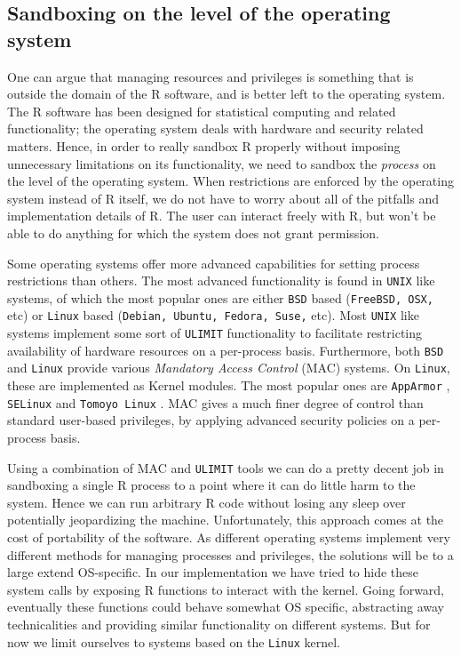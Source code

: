 \documentclass{jss}
\newcommand{\R}{\textsf{R}\xspace}
\newcommand{\AppArmor}{\texttt{AppArmor}\xspace}
\newcommand{\Linux}{\texttt{Linux}\xspace}
\newcommand{\ULIMIT}{\texttt{ULIMIT}\xspace}
\begin{document}
\subsection{Sandboxing on the level of the operating system}

One can argue that managing resources and privileges is something that
is outside the domain of the \R software, and is better left to the
operating system. The \R software has been designed for statistical
computing and related functionality; the operating system deals with hardware
and security related matters. Hence, in order to really sandbox \R
properly without imposing unnecessary limitations on its functionality, we need
to sandbox the \emph{process} on the level of the operating system. When
restrictions are enforced by the operating system instead of \R
itself, we do not have to worry about all of the pitfalls and implementation
details of \R. The user can interact freely with \R, but
won't be able to do anything for which the system does not grant permission. 

Some operating systems offer more advanced capabilities for setting process
restrictions than others. The most advanced functionality is found in
\texttt{UNIX} like systems, of which the most popular ones are either
\texttt{BSD} based (\texttt{FreeBSD, OSX,} etc) or \Linux based
(\texttt{Debian, Ubuntu, Fedora, Suse,} etc). Most \texttt{UNIX} like
systems implement some sort of \ULIMIT functionality to facilitate
restricting availability of hardware resources on a per-process basis.
Furthermore, both \texttt{BSD} and \Linux provide various
\emph{Mandatory Access Control} (MAC) systems. On \Linux,
these are implemented as Kernel modules. The most popular ones are \AppArmor
\citep{apparmor}, \texttt{SELinux} \citep{selinux} and \texttt{Tomoyo Linux}
\citep{tomoyo}. MAC gives a much finer degree of control than standard
user-based privileges, by applying advanced security policies on a per-process
basis.

Using a combination of MAC and \ULIMIT tools we can do a pretty
decent job in sandboxing a single \R process to a point where it can do little
harm to the system. Hence we can run arbitrary \R code without losing
any sleep over potentially jeopardizing the machine. Unfortunately, this
approach comes at the cost of portability of the software. As different
operating systems implement very different methods for managing processes and
privileges, the solutions will be to a large extend OS-specific. In our
implementation we have tried to hide these system calls by exposing \R functions
to interact with the kernel. Going forward, eventually these functions could
behave somewhat OS specific, abstracting away technicalities and providing
similar functionality on different systems. But for now we limit ourselves to
systems based on the \Linux kernel.
\end{document}

